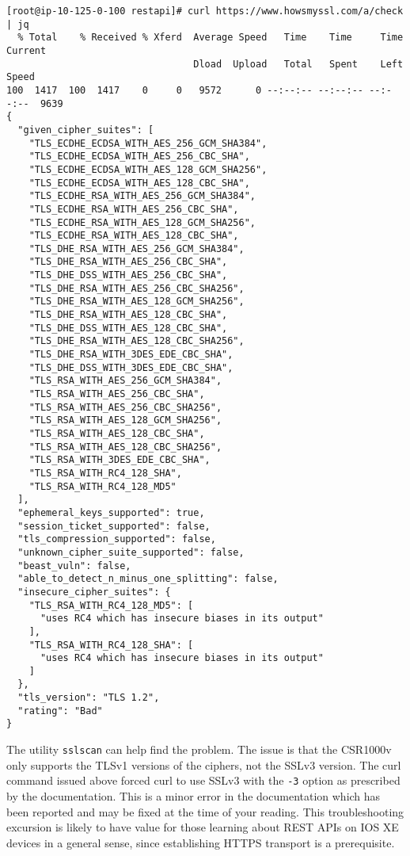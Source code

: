 \begin{verbatim}
[root@ip-10-125-0-100 restapi]# curl https://www.howsmyssl.com/a/check | jq
  % Total    % Received % Xferd  Average Speed   Time    Time     Time  Current
                                 Dload  Upload   Total   Spent    Left  Speed
100  1417  100  1417    0     0   9572      0 --:--:-- --:--:-- --:--:--  9639
{
  "given_cipher_suites": [
    "TLS_ECDHE_ECDSA_WITH_AES_256_GCM_SHA384",
    "TLS_ECDHE_ECDSA_WITH_AES_256_CBC_SHA",
    "TLS_ECDHE_ECDSA_WITH_AES_128_GCM_SHA256",
    "TLS_ECDHE_ECDSA_WITH_AES_128_CBC_SHA",
    "TLS_ECDHE_RSA_WITH_AES_256_GCM_SHA384",
    "TLS_ECDHE_RSA_WITH_AES_256_CBC_SHA",
    "TLS_ECDHE_RSA_WITH_AES_128_GCM_SHA256",
    "TLS_ECDHE_RSA_WITH_AES_128_CBC_SHA",
    "TLS_DHE_RSA_WITH_AES_256_GCM_SHA384",
    "TLS_DHE_RSA_WITH_AES_256_CBC_SHA",
    "TLS_DHE_DSS_WITH_AES_256_CBC_SHA",
    "TLS_DHE_RSA_WITH_AES_256_CBC_SHA256",
    "TLS_DHE_RSA_WITH_AES_128_GCM_SHA256",
    "TLS_DHE_RSA_WITH_AES_128_CBC_SHA",
    "TLS_DHE_DSS_WITH_AES_128_CBC_SHA",
    "TLS_DHE_RSA_WITH_AES_128_CBC_SHA256",
    "TLS_DHE_RSA_WITH_3DES_EDE_CBC_SHA",
    "TLS_DHE_DSS_WITH_3DES_EDE_CBC_SHA",
    "TLS_RSA_WITH_AES_256_GCM_SHA384",
    "TLS_RSA_WITH_AES_256_CBC_SHA",
    "TLS_RSA_WITH_AES_256_CBC_SHA256",
    "TLS_RSA_WITH_AES_128_GCM_SHA256",
    "TLS_RSA_WITH_AES_128_CBC_SHA",
    "TLS_RSA_WITH_AES_128_CBC_SHA256",
    "TLS_RSA_WITH_3DES_EDE_CBC_SHA",
    "TLS_RSA_WITH_RC4_128_SHA",
    "TLS_RSA_WITH_RC4_128_MD5"
  ],
  "ephemeral_keys_supported": true,
  "session_ticket_supported": false,
  "tls_compression_supported": false,
  "unknown_cipher_suite_supported": false,
  "beast_vuln": false,
  "able_to_detect_n_minus_one_splitting": false,
  "insecure_cipher_suites": {
    "TLS_RSA_WITH_RC4_128_MD5": [
      "uses RC4 which has insecure biases in its output"
    ],
    "TLS_RSA_WITH_RC4_128_SHA": [
      "uses RC4 which has insecure biases in its output"
    ]
  },
  "tls_version": "TLS 1.2",
  "rating": "Bad"
}
\end{verbatim}

The utility \verb|sslscan| can help find the problem. The issue is that the
CSR1000v only supports the TLSv1 versions of the ciphers, not the SSLv3
version. The curl command issued above forced curl to use SSLv3 with the
\verb|-3| option as prescribed by the documentation. This is a minor error in
the documentation which has been reported and may be fixed at the time of your
reading. This troubleshooting excursion is likely to have value for those
learning about REST APIs on IOS XE devices in a general sense, since
establishing HTTPS transport is a prerequisite. 

